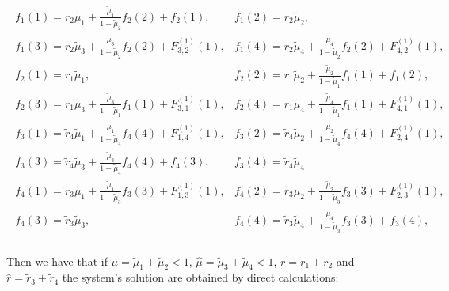\begin{eqnarray*}
\begin{array}{ll}
f_{1}\left(1\right)=r_{2}\tilde{\mu}_{1}+\frac{\tilde{\mu}_{1}}{1-\tilde{\mu}_{2}}f_{2}\left(2\right)+f_{2}\left(1\right),&
f_{1}\left(2\right)=r_{2}\tilde{\mu}_{2},\\
f_{1}\left(3\right)=r_{2}\tilde{\mu}_{3}+\frac{\tilde{\mu}_{3}}{1-\tilde{\mu}_{2}}f_{2}\left(2\right)+F_{3,2}^{(1)}\left(1\right),&
f_{1}\left(4\right)=r_{2}\tilde{\mu}_{4}+\frac{\tilde{\mu}_{4}}{1-\tilde{\mu}_{2}}f_{2}\left(2\right)+F_{4,2}^{(1)}\left(1\right),\\
f_{2}\left(1\right)=r_{1}\tilde{\mu}_{1},&
f_{2}\left(2\right)=r_{1}\tilde{\mu}_{2}+\frac{\tilde{\mu}_{2}}{1-\tilde{\mu}_{1}}f_{1}\left(1\right)+f_{1}\left(2\right),\\
f_{2}\left(3\right)=r_{1}\tilde{\mu}_{3}+\frac{\tilde{\mu}_{3}}{1-\tilde{\mu}_{1}}f_{1}\left(1\right)+F_{3,1}^{(1)}\left(1\right),&
f_{2}\left(4\right)=r_{1}\tilde{\mu}_{4}+\frac{\tilde{\mu}_{4}}{1-\tilde{\mu}_{1}}f_{1}\left(1\right)+F_{4,1}^{(1)}\left(1\right),\\
f_{3}\left(1\right)=\tilde{r}_{4}\tilde{\mu}_{1}+\frac{\tilde{\mu}_{1}}{1-\tilde{\mu}_{4}}f_{4}\left(4\right)+F_{1,4}^{(1)}\left(1\right),&
f_{3}\left(2\right)=\tilde{r}_{4}\tilde{\mu}_{2}+\frac{\tilde{\mu}_{2}}{1-\tilde{\mu}_{4}}f_{4}\left(4\right)+F_{2,4}^{(1)}\left(1\right),\\
f_{3}\left(3\right)=\tilde{r}_{4}\tilde{\mu}_{3}+\frac{\tilde{\mu}_{3}}{1-\tilde{\mu}_{4}}f_{4}\left(4\right)+f_{4}\left(3\right),&
f_{3}\left(4\right)=\tilde{r}_{4}\tilde{\mu}_{4}\\
f_{4}\left(1\right)=\tilde{r}_{3}\tilde{\mu}_{1}+\frac{\tilde{\mu}_{1}}{1-\tilde{\mu}_{3}}f_{3}\left(3\right)+F_{1,3}^{(1)}\left(1\right),&
f_{4}\left(2\right)=\tilde{r}_{3}\mu_{2}+\frac{\tilde{\mu}_{2}}{1-\tilde{\mu}_{3}}f_{3}\left(3\right)+F_{2,3}^{(1)}\left(1\right),\\
f_{4}\left(3\right)=\tilde{r}_{3}\tilde{\mu}_{3},&
f_{4}\left(4\right)=\tilde{r}_{3}\tilde{\mu}_{4}+\frac{\tilde{\mu}_{4}}{1-\tilde{\mu}_{3}}f_{3}\left(3\right)+f_{3}\left(4\right),\\
\end{array}
\end{eqnarray*}

Then we have that if $\mu=\tilde{\mu}_{1}+\tilde{\mu}_{2}<1$, $\hat{\mu}=\tilde{\mu}_{3}+\tilde{\mu}_{4}<1$, $r=r_{1}+r_{2}$ and $\hat{r}=\tilde{r}_{3}+\tilde{r}_{4}$  the system's solution are obtained by direct calculations:

